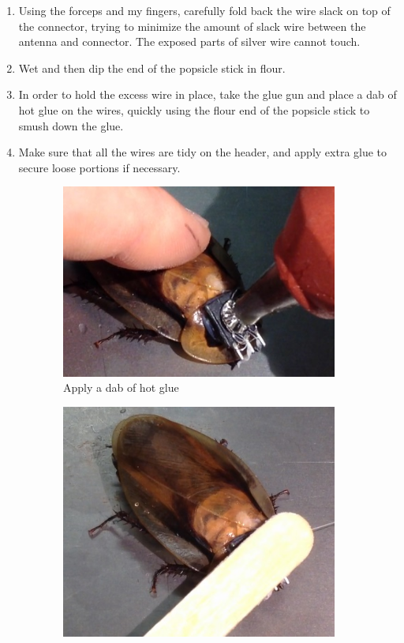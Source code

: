 \begin{enumerate}
\item Using the forceps and my fingers, carefully fold back the wire slack on top of the connector, trying to minimize the amount of slack wire between the antenna and connector. The exposed parts of silver wire cannot touch.
\item Wet and then dip the end of the popsicle stick in flour.
\item In order to hold the excess wire in place, take the glue gun and place a dab of hot glue on the wires, quickly using the flour end of the popsicle stick to smush down the glue.
\item Make sure that all the wires are tidy on the header, and apply extra glue to secure loose portions if necessary.
\end{enumerate}
\begin{figure}[ht!]
\centering
    \begin{subfigure}{.49\textwidth}
    \centering
    \includegraphics[scale=0.4]{Surgery Photos/gluewires.jpg}
    \caption{Apply a dab of hot glue}
    \label{fig:gluewires}
    \end{subfigure}
    \begin{subfigure}{.49\textwidth}
    \centering
    \includegraphics[scale=0.3]{Surgery Photos/gluewires1.jpg}

\end{subfigure}
\end{figure}
